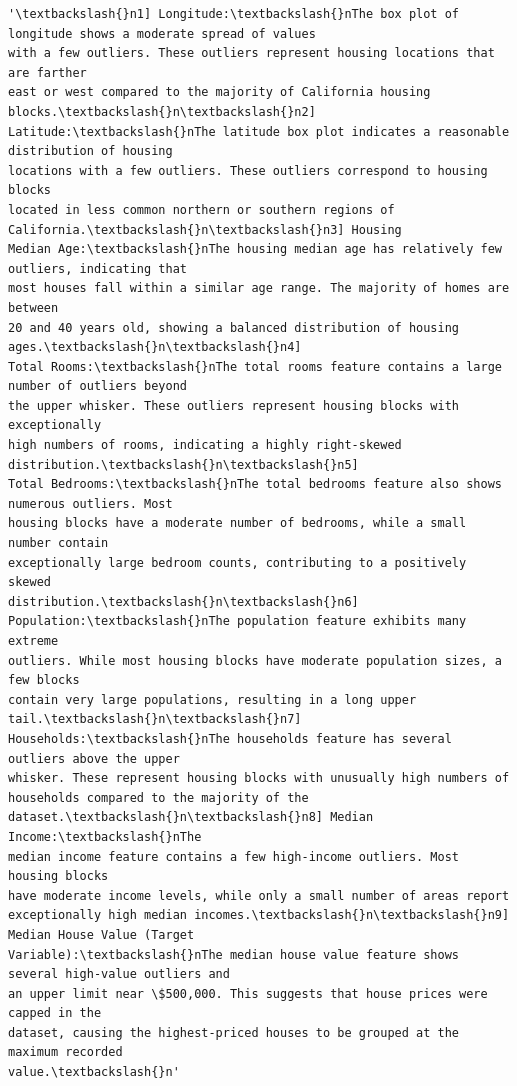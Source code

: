 \documentclass[11pt]{article}
\makeatletter
\newcommand{\boxspacing}{\kern\kvtcb@left@rule\kern\kvtcb@boxsep}
\newcommand{\prompt}[4]{
        {\ttfamily\llap{{\color{#2}[#3]:\hspace{3pt}#4}}\vspace{-\baselineskip}}
    }
\makeatother
\begin{document}
            \begin{tcolorbox}[breakable, size=fbox, boxrule=.5pt, pad at break*=1mm, opacityfill=0]
\prompt{Out}{outcolor}{64}{\boxspacing}
\begin{Verbatim}[commandchars=\\\{\}]
'\textbackslash{}n1] Longitude:\textbackslash{}nThe box plot of longitude shows a moderate spread of values
with a few outliers. These outliers represent housing locations that are farther
east or west compared to the majority of California housing blocks.\textbackslash{}n\textbackslash{}n2]
Latitude:\textbackslash{}nThe latitude box plot indicates a reasonable distribution of housing
locations with a few outliers. These outliers correspond to housing blocks
located in less common northern or southern regions of California.\textbackslash{}n\textbackslash{}n3] Housing
Median Age:\textbackslash{}nThe housing median age has relatively few outliers, indicating that
most houses fall within a similar age range. The majority of homes are between
20 and 40 years old, showing a balanced distribution of housing ages.\textbackslash{}n\textbackslash{}n4]
Total Rooms:\textbackslash{}nThe total rooms feature contains a large number of outliers beyond
the upper whisker. These outliers represent housing blocks with exceptionally
high numbers of rooms, indicating a highly right-skewed distribution.\textbackslash{}n\textbackslash{}n5]
Total Bedrooms:\textbackslash{}nThe total bedrooms feature also shows numerous outliers. Most
housing blocks have a moderate number of bedrooms, while a small number contain
exceptionally large bedroom counts, contributing to a positively skewed
distribution.\textbackslash{}n\textbackslash{}n6] Population:\textbackslash{}nThe population feature exhibits many extreme
outliers. While most housing blocks have moderate population sizes, a few blocks
contain very large populations, resulting in a long upper tail.\textbackslash{}n\textbackslash{}n7]
Households:\textbackslash{}nThe households feature has several outliers above the upper
whisker. These represent housing blocks with unusually high numbers of
households compared to the majority of the dataset.\textbackslash{}n\textbackslash{}n8] Median Income:\textbackslash{}nThe
median income feature contains a few high-income outliers. Most housing blocks
have moderate income levels, while only a small number of areas report
exceptionally high median incomes.\textbackslash{}n\textbackslash{}n9] Median House Value (Target
Variable):\textbackslash{}nThe median house value feature shows several high-value outliers and
an upper limit near \$500,000. This suggests that house prices were capped in the
dataset, causing the highest-priced houses to be grouped at the maximum recorded
value.\textbackslash{}n'
\end{Verbatim}
\end{tcolorbox}
        
\end{document}

